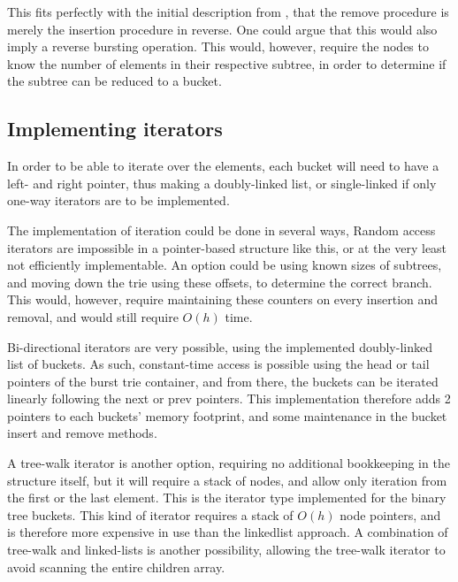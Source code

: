 This fits perfectly with the initial description from \cite{Nash2008}, that
the remove procedure is merely the insertion procedure in reverse. One could argue
that this would also imply a reverse bursting operation. This would, however,
require the nodes to know the number of elements in their respective subtree,
in order to determine if the subtree can be reduced to a bucket.

\subsection{Implementing iterators}
In order to be able to iterate over the elements, each bucket will need
to have a {\keyword left}- and {\keyword right} pointer, thus making a
doubly-linked list, or single-linked if only one-way iterators are to
be implemented.


The implementation of iteration could be done in several ways, 
Random access iterators are impossible in a pointer-based structure like this,
or at the very least not efficiently implementable. An option could be using known
sizes of subtrees, and moving down the trie using these offsets, to determine the
correct branch. This would, however, require maintaining these counters on every
insertion and removal, and would still require $O(h)$ time.

Bi-directional iterators are very possible, using the implemented doubly-linked
list of buckets. As such, constant-time access is possible using the head or tail
pointers of the burst trie container, and from there, the buckets can be iterated
linearly following the {\keyword next} or {\keyword prev} pointers. This implementation
therefore adds 2 pointers to each buckets' memory footprint, and some maintenance in the
bucket insert and remove methods.

A tree-walk iterator is another option, requiring no additional bookkeeping in the structure
itself, but it will require a stack of nodes, and allow only iteration from the first or the last element.
This is the iterator type implemented for the binary tree buckets. This kind of iterator requires
a stack of $O(h)$ node pointers, and is therefore more expensive in use than the linkedlist approach.
A combination of tree-walk and linked-lists is another possibility, allowing the tree-walk iterator
to avoid scanning the entire children array.

